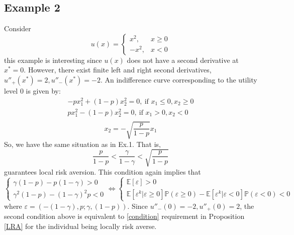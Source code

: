 \documentclass[a4paper]{article}
\newcommand{\prob}{\mathbb{P}}
\newcommand{\expect}{\mathbb{E}}
\newcommand{\eps}{\varepsilon}
\begin{document}
\subsection{Example 2}
Consider $$u(x) = \begin{cases}
	x^2, &x \ge 0\\-x^2, &x < 0
\end{cases}$$
this example is interesting since $u(x)$ does not have a second derivative at $x^* = 0$. However, there exist finite left and right second derivatives, $u''_{+}(x^*) = 2, u''_{-}(x^*) = -2$. An indifference curve corresponding to the utility level 0 is given by:
\begin{align*}
	-px_1^2 + (1-p)x_2^2 = 0,\ \text{if } x_1 \le 0, x_2 \ge 0\\
	px_1^2-(1-p)x_2^2 = 0,\ \text{if } x_1 > 0, x_2 < 0\\
\end{align*}
$$	x_2 = -\sqrt{\frac{p}{1-p}}x_1$$
So, we have the same situation as in Ex.1. That is, $$\frac{p}{1-p}<\frac{\gamma}{1-\gamma}<\sqrt{\frac{p}{1-p}}$$ guarantees local risk aversion. This condition again implies that $$\begin{cases}
	\gamma(1-p)-p(1-\gamma)>0\\
	\gamma^2(1-p) - (1-\gamma)^2p < 0
\end{cases} \iff \begin{cases}
\expect[\eps]>0\\
\expect[ \eps^k | \eps\ge0]\prob(\eps\ge0) -\expect[ \eps^k | \eps<0]\prob(\eps<0) < 0
\end{cases}$$
where $\eps = (-(1-\gamma), p; \gamma, (1-p))$. Since $u''_{-}(0) = -2, u''_{+}(0)=2$, the second condition above is equivalent to \eqref{condition} requirement in Proposition \ref{LRA} for the individual being locally risk averse.
\end{document}
